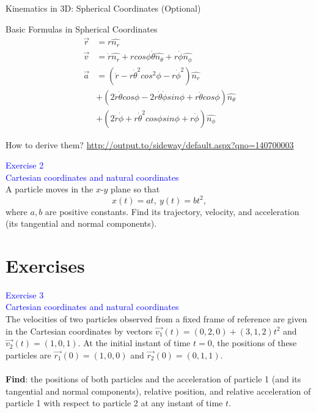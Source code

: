\documentclass{beamer}
\begin{document}
\begin{frame}{Kinematics in 3D: Spherical Coordinates (Optional)}
  \begin{block}{Basic Formulas in Spherical Coordinates}
  \begin{align*}
    \vec{r}&= r\hat{n_r}\\
    \vec{v}&= \dot{r}\hat{n_r}+r cos\phi\dot{\theta}\hat{n_\theta}+r\dot{\phi}\hat{n_\phi}\\
    \vec{a}&= (\ddot{r}-r\dot{\theta}^2cos^2 \phi-r\dot{\phi}^2)\hat{n_r}\\ & +(2\dot{r}\dot{\theta}cos\phi-2r\dot{\theta}\dot{\phi}sin\phi+r\ddot{\theta}cos\phi)\hat{n_\theta}\\ & +(2\dot{r}\dot{\phi}+r\dot{\theta}^2cos\phi sin\phi+r\ddot{\phi})\hat{n_\phi}
    \end{align*}
  \end{block}\pause
  How to derive them?
  \textcolor{blue}{\url{http://output.to/sideway/default.aspx?qno=140700003}}
\end{frame}

\begin{frame}
\textcolor{blue}{Exercise 2}\\
\textcolor{blue}{\footnotesize{Cartesian coordinates and natural coordinates}}\\
A particle moves in the $x$-$y$ plane so that$$x(t) = at,\ y(t) = bt^2,$$
where $a, b$ are positive constants. Find its trajectory, velocity, and acceleration (its tangential and
normal components).
\end{frame}

\section{Exercises}
\begin{frame}
  \textcolor{blue}{Exercise 3}\\
  \textcolor{blue}{\footnotesize{Cartesian coordinates and natural coordinates}}\\
  The velocities of two particles observed from a fixed frame of reference are given in the Cartesian
  coordinates by vectors $\vec{v_1}(t) = (0, 2, 0) + (3, 1, 2)t^2$ and $\vec{v_2}(t) = (1, 0, 1).$ At the initial instant of
  time $t = 0$, the positions of these particles are $\vec{r_1}(0) = (1, 0, 0)$ and $\vec{r_2}(0) = (0, 1, 1).$
  \\
  ~\\ \textbf{Find}: the positions of both particles and the acceleration of particle 1 (and its tangential and normal
  components), relative position, and relative acceleration of particle 1 with respect to particle 2 at
  any instant of time $t$.
  \end{frame}
\end{document}
